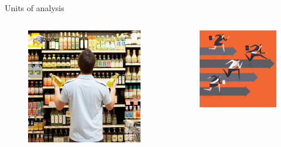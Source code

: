 \documentclass{beamer}
\begin{document}
\begin{frame}{Units of analysis}

	\begin{columns}[onlytextwidth]

		\begin{figure}[htpb]
			\centering
			\includegraphics[width=0.8\linewidth]{../img/consumer.jpeg}
		\end{figure}


		\begin{figure}[htpb]
			\centering
			\includegraphics[width=0.8\linewidth]{../img/firms.jpg}
		\end{figure}
	\end{columns}

\end{frame}{}
\end{document}
